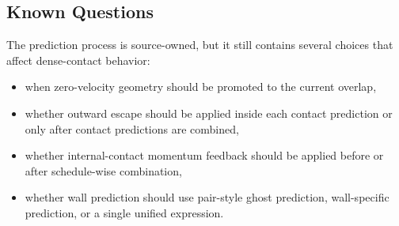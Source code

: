 \subsection{Known Questions}

The prediction process is source-owned, but it still contains several choices
that affect dense-contact behavior:
\begin{itemize}
    \item when zero-velocity geometry should be promoted to the current overlap,
    \item whether outward escape should be applied inside each contact
          prediction or only after contact predictions are combined,
    \item whether internal-contact momentum feedback should be applied before
          or after schedule-wise combination,
    \item whether wall prediction should use pair-style ghost prediction,
          wall-specific prediction, or a single unified expression.
\end{itemize}
